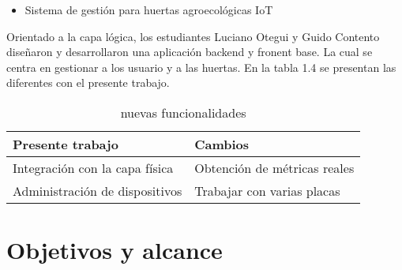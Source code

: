 \begin{itemize}
\item Sistema de gestión para huertas agroecológicas IoT
\end{itemize}
Orientado a la capa lógica, los estudiantes Luciano Otegui y Guido Contento diseñaron y desarrollaron una aplicación backend y fronent base. La cual se centra en gestionar a los usuario y a las huertas. En la tabla 1.4 se presentan las diferentes con el presente trabajo.\\

\begin{table}[h]
	\centering
	\caption[caption corto]{nuevas funcionalidades}
	\begin{tabular}{l l}    
		\toprule
		\textbf{Presente trabajo} & \textbf{Cambios}\\	
		\midrule
		Integración con la capa física           & Obtención de métricas reales	\\		
		Administración de dispositivos          & Trabajar con varias placas\\		
		\bottomrule
		\hline
	\end{tabular}
	\label{tab:peces}
\end{table}


\section{Objetivos y alcance}

